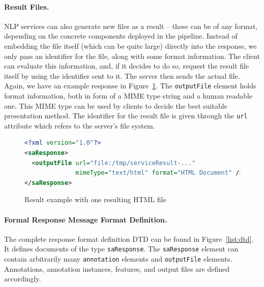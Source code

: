 \paragraph{Result Files.} NLP services can also generate new files as
a result -- these can be of any format, depending on the concrete
components deployed in the pipeline. Instead of embedding the file
itself (which can be quite large) directly into the response, we only
pass an identifier for the file, along with some format information.
The client can evaluate this information, and, if it decides to do so,
request the result file itself by using the identifier sent to it. The
server then sends the actual file. Again, we have an example response
in Figure~\ref{list:response3}. The \texttt{outputFile} element holds
format information, both in form of a MIME type string and a human
readable one. This MIME type can be used by clients to decide the best suitable
presentation method. The identifier for the result file is given through the
\texttt{url} attribute which refers to the server's file system.

\begin{figure}
\begin{lstlisting}[language=XML,xleftmargin=8mm,columns=flexible]
<?xml version="1.0"?>
<saResponse>
  <outputFile url="file:/tmp/serviceResult-..."
              mimeType="text/html" format="HTML Document" />
</saResponse>
\end{lstlisting}
\vspace*{-2mm}
\caption{Result example with one resulting HTML file}
\label{list:response3}
\end{figure}


\paragraph{Formal Response Message Format Definition.} The complete
response format definition DTD can be found in
Figure~\ref{list:dtd}. It defines documents of the type
\texttt{saResponse}. The \texttt{saResponse} element can contain
arbitrarily many \texttt{annotation} elements and \texttt{outputFile}
elements. Annotations, annotation instances, features, and output
files are defined accordingly.

